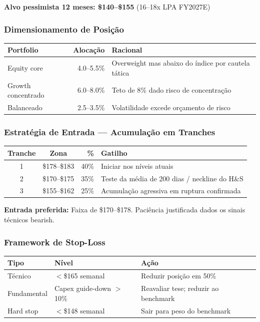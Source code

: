 \documentclass[11pt,a4paper]{article}
\begin{document}
\noindent\textbf{Alvo pessimista 12 meses: \$140--\$155} (16--18x LPA FY2027E)

\subsubsection{Dimensionamento de Posi\c{c}\~ao}

\begin{table}[h]
\centering
\begin{tabularx}{\textwidth}{lrX}
\toprule
\textbf{Portfolio} & \textbf{Aloca\c{c}\~ao} & \textbf{Racional} \\
\midrule
Equity core & 4.0--5.5\% & Overweight mas abaixo do \'indice por cautela t\'atica \\
Growth concentrado & 6.0--8.0\% & Teto de 8\% dado risco de concentra\c{c}\~ao \\
Balanceado & 2.5--3.5\% & Volatilidade excede or\c{c}amento de risco \\
\bottomrule
\end{tabularx}
\end{table}

\subsubsection{Estrat\'egia de Entrada --- Acumula\c{c}\~ao em Tranches}

\begin{table}[h]
\centering
\begin{tabularx}{\textwidth}{ccrX}
\toprule
\textbf{Tranche} & \textbf{Zona} & \textbf{\%} & \textbf{Gatilho} \\
\midrule
1 & \$178--\$183 & 40\% & Iniciar nos n\'iveis atuais \\
2 & \$170--\$175 & 35\% & Teste da m\'edia de 200 dias / neckline do H\&S \\
3 & \$155--\$162 & 25\% & Acumula\c{c}\~ao agressiva em ruptura confirmada \\
\bottomrule
\end{tabularx}
\end{table}

\noindent\textbf{Entrada preferida:} Faixa de \$170--\$178. Paci\^encia justificada dados os sinais t\'ecnicos bearish.

\subsubsection{Framework de Stop-Loss}

\begin{table}[h]
\centering
\begin{tabularx}{\textwidth}{llX}
\toprule
\textbf{Tipo} & \textbf{N\'ivel} & \textbf{A\c{c}\~ao} \\
\midrule
T\'ecnico & $<$\$165 semanal & Reduzir posi\c{c}\~ao em 50\% \\
Fundamental & Capex guide-down $>$10\% & Reavaliar tese; reduzir ao benchmark \\
Hard stop & $<$\$148 semanal & Sair para peso do benchmark \\
\bottomrule
\end{tabularx}
\end{table}
\end{document}
